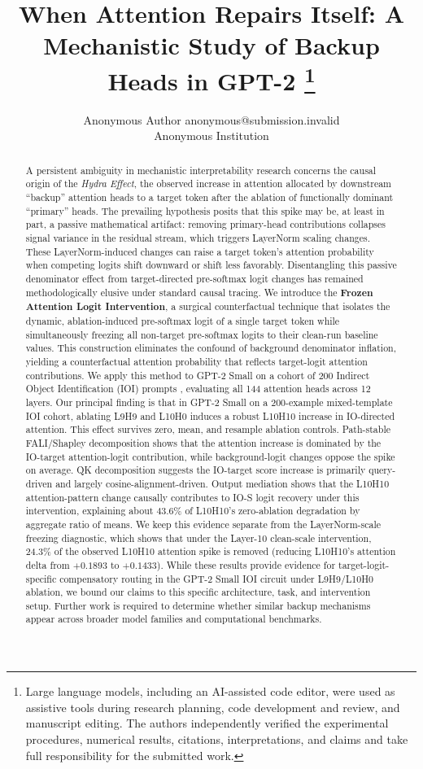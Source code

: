 \documentclass[10pt]{article} %
\title{When Attention Repairs Itself: A Mechanistic Study of Backup Heads in GPT-2%
\thanks{Large language models, including an AI-assisted code editor, were used
as assistive tools during research planning, code development and review,
and manuscript editing. The authors independently verified the experimental
procedures, numerical results, citations, interpretations, and claims and take
full responsibility for the submitted work.}}
\author{\name Anonymous Author \email anonymous@submission.invalid \\
      \addr Anonymous Institution}
\begin{document}
\maketitle

\begin{abstract}
A persistent ambiguity in mechanistic interpretability research concerns the
causal origin of the \emph{Hydra Effect}, the observed increase in attention
allocated by downstream ``backup'' attention heads to a target token after the
ablation of functionally dominant ``primary'' heads. The prevailing hypothesis
posits that this spike may be, at least in part, a passive mathematical artifact:
removing primary-head contributions collapses signal variance in the residual stream,
which triggers LayerNorm scaling changes. These LayerNorm-induced changes can raise
a target token's attention probability when competing logits shift downward or
shift less favorably. Disentangling this passive denominator effect from target-directed pre-softmax logit
changes has remained methodologically elusive under standard causal tracing.
We introduce the \textbf{Frozen Attention Logit Intervention}, a surgical
counterfactual technique that isolates the dynamic, ablation-induced pre-softmax
logit of a single target token while simultaneously freezing all non-target
pre-softmax logits to their clean-run baseline values. This construction
eliminates the confound of background denominator inflation, yielding a
counterfactual attention probability that reflects target-logit attention contributions.
We apply this method to GPT-2 Small \citep{radford2019language} on a cohort of
200 Indirect Object Identification (IOI) prompts \citep{wang2022interpretability},
evaluating all 144 attention heads across 12 layers.
Our principal finding is that in GPT-2 Small on a 200-example mixed-template
IOI cohort, ablating L9H9 and L10H0 induces a robust L10H10 increase in IO-directed
attention. This effect survives zero, mean, and resample ablation controls.
Path-stable FALI/Shapley decomposition shows that the attention increase is
dominated by the IO-target attention-logit contribution, while background-logit
changes oppose the spike on average. QK decomposition suggests the IO-target score
increase is primarily query-driven and largely cosine-alignment-driven.
Output mediation shows that the L10H10 attention-pattern change causally contributes
to IO-S logit recovery under this intervention, explaining about 43.6\% of
L10H10's zero-ablation degradation by aggregate ratio of means. We keep this
evidence separate from the LayerNorm-scale freezing diagnostic, which shows that under
the Layer-10 clean-scale intervention, 24.3\% of the observed L10H10 attention spike is removed
(reducing L10H10's attention delta from $+0.1893$ to $+0.1433$). While these results provide evidence for target-logit-specific compensatory routing in the GPT-2 Small IOI circuit under L9H9/L10H0 ablation, we bound our claims to this specific architecture, task, and intervention setup. Further work is required to determine whether similar backup mechanisms appear across broader model families and computational benchmarks.
\end{abstract}
\end{document}
